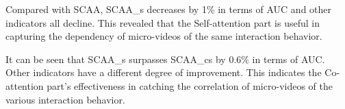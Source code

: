 \documentclass[letterpaper]{article} %
\begin{document}
    Compared with SCAA, SCAA\_s decreases by 1\% in terms of AUC and other indicators all decline. This revealed that the Self-attention part is useful in capturing the dependency of micro-videos of the same interaction behavior.
		
    It can be seen that SCAA\_s surpasses SCAA\_cs by 0.6\% in terms of AUC. Other indicators have a different degree of improvement. This indicates the Co-attention part's effectiveness in catching the correlation of micro-videos of the various interaction behavior.  
		
	


	
\end{document}

